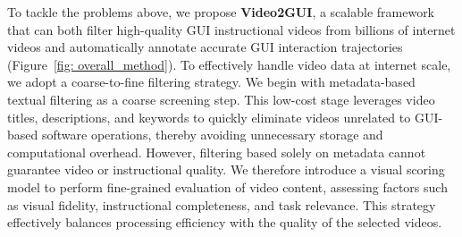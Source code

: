\documentclass{article}
\theoremstyle{plain}
\theoremstyle{definition}
\theoremstyle{remark}
\begin{document}
To tackle the problems above, we propose \textbf{Video2GUI}, a scalable framework that can both filter high-quality GUI instructional videos from billions of internet videos and automatically annotate accurate GUI interaction trajectories (Figure~\ref{fig: overall_method}).
To effectively handle video data at internet scale, we adopt a coarse-to-fine filtering strategy. We begin with metadata-based textual filtering as a coarse screening step. This low-cost stage leverages video titles, descriptions, and keywords to quickly eliminate videos unrelated to GUI-based software operations, thereby avoiding unnecessary storage and computational overhead. However, filtering based solely on metadata cannot guarantee video or instructional quality. We therefore introduce a visual scoring model to perform fine-grained evaluation of video content, assessing factors such as visual fidelity, instructional completeness, and task relevance. This strategy effectively balances processing efficiency with the quality of the selected videos.
\end{document}

